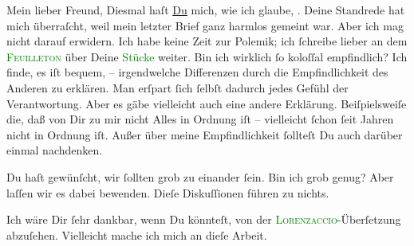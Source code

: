 \pstart{}Mein lieber Freund,\pend
\pstart
           Diesmal haſt \uline{Du} mich, wie ich glaube, \label{K_L03193-1v}\label{K_L03193-1h}. Deine Standrede hat mich  überraſcht,
               weil mein letzter Brief ganz harmlos gemeint war. Aber ich mag nicht darauf erwidern.
               Ich habe keine Zeit zur Polemik; ich ſchreibe lieber an dem \textsc{\textcolor{green}{Feuilleton}{}\ledrightnote{{$\rightarrow$}\textcolor{green}{Berliner Theater. (»Lebendige Stunden« von Arthur Schnitzler.)}}} über Deine \textcolor{green}{Stücke}{}\ledrightnote{{$\rightarrow$}\textcolor{green}{Lebendige Stunden. Vier Einakter}}
               weiter. Bin ich wirklich ſo koloſſal empfindlich? Ich finde, es iſt bequem, –  irgendwelche
               Differenzen durch die Empfindlichkeit des Anderen zu erklären. Man erſpart ſich
               ſelbſt dadurch jedes Gefühl der Verantwortung. Aber es gäbe vielleicht auch eine
               andere Erklärung. Beiſpielsweiſe die, daß von Dir zu mir nicht Alles in Ordnung iſt –
               vielleicht ſchon ſeit Jahren nicht in Ordnung iſt. Außer über meine Empfindlichkeit
               ſollteſt Du auch darüber einmal nachdenken.\pend
           
\pstart
           Du haſt gewünſcht, wir ſollten grob zu einander ſein. Bin ich grob genug? Aber laſſen
               wir es dabei {\pb}bewenden. Dieſe Diskuſſionen führen zu
               nichts.\pend
           
\pstart
           Ich wäre Dir ſehr dankbar, wenn Du \label{K_L03193-2v}\label{K_L03193-2h} könnteſt, von der \textsc{\textcolor{green}{Lorenzaccio}{}\ledrightnote{{$\rightarrow$}\textcolor{green}{Lorenzaccio. Drame romantique en cinq actes}}}-Überſetzung abzuſehen. Vielleicht mache ich mich \label{K_L03193-4v}\label{K_L03193-4h} an dieſe Arbeit.\pend
           

